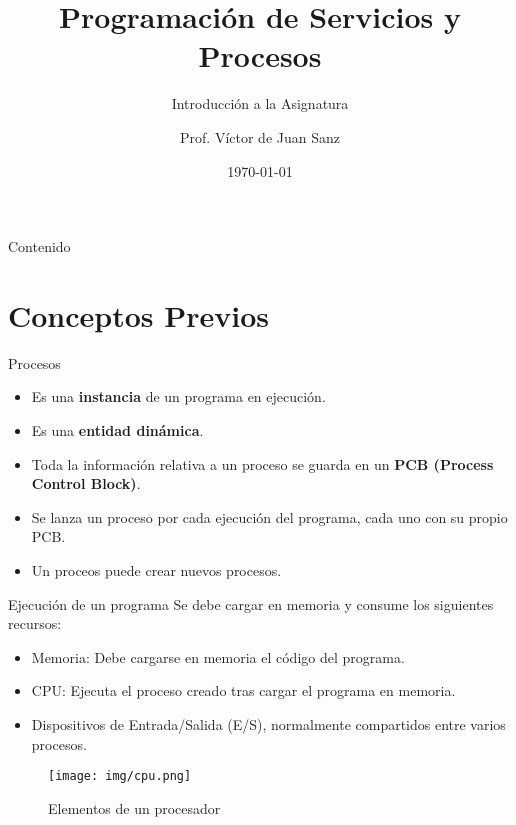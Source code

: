 \documentclass{beamer}
\title{Programación de Servicios y Procesos}
\subtitle{Introducción a la Asignatura}
\author{Prof. Víctor de Juan Sanz}
\institute{Colegio Santo Domingo Savio}
\date{\today}
\begin{document}
\begin{frame}
    \titlepage
\end{frame}

\begin{frame}{Contenido}
    \tableofcontents
\end{frame}

\section{Conceptos Previos}

\begin{frame}{Procesos}
    \begin{itemize}
        \item Es una \textbf{instancia} de un programa en ejecución.
        \item Es una \textbf{entidad dinámica}.
        \item Toda la información relativa a un proceso se guarda en un \textbf{PCB (Process Control Block)}.
        \item Se lanza un proceso por cada ejecución del programa, cada uno con su propio PCB.
        \item Un proceos puede crear nuevos procesos.
    \end{itemize}
\end{frame}


\begin{frame}{Ejecución de un programa}
    Se debe cargar en memoria y consume los siguientes recursos:
        \begin{itemize}
            \item Memoria: Debe cargarse en memoria el código del programa.
            \item CPU: Ejecuta el proceso creado tras cargar el programa en memoria.
            \item Dispositivos de Entrada/Salida (E/S), normalmente compartidos entre varios procesos.
        \end{itemize}
    
\end{frame}


\begin{frame}
  \begin{figure}
        \centering
        \texttt{[image: img/cpu.png]}
        \caption{Elementos de un procesador}
    \end{figure}

\end{frame}
\end{document}
